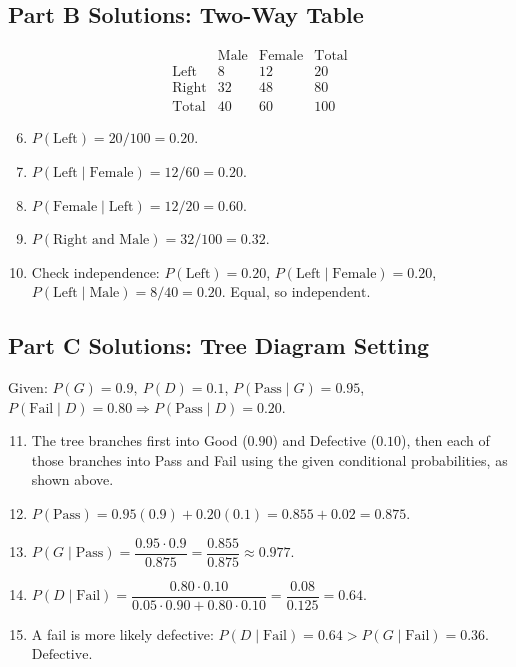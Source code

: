 \documentclass[14pt]{extarticle}
\begin{document}
\subsection*{Part B Solutions: Two-Way Table}
\[
\begin{array}{c|ccc}
 & \text{Male} & \text{Female} & \text{Total} \\ \hline
\text{Left} & 8 & 12 & 20\\
\text{Right} & 32 & 48 & 80\\ \hline
\text{Total} & 40 & 60 & 100
\end{array}
\]
\begin{enumerate}
  \setcounter{enumi}{5}
  \item \(P(\text{Left})=20/100=\boxed{0.20}\).
  \item \(P(\text{Left}\mid \text{Female})=12/60=\boxed{0.20}\).
  \item \(P(\text{Female}\mid \text{Left})=12/20=\boxed{0.60}\).
  \item \(P(\text{Right and Male})=32/100=\boxed{0.32}\).
  \item Check independence: \(P(\text{Left})=0.20\), \(P(\text{Left}\mid \text{Female})=0.20\), \(P(\text{Left}\mid \text{Male})=8/40=0.20\). Equal, so \(\boxed{\text{independent}}\).
\end{enumerate}

\subsection*{Part C Solutions: Tree Diagram Setting}
Given: \(P(G)=0.9,\ P(D)=0.1\), \(P(\text{Pass}\mid G)=0.95\), \(P(\text{Fail}\mid D)=0.80\Rightarrow P(\text{Pass}\mid D)=0.20\).
\begin{enumerate}
  \setcounter{enumi}{10}
  \item The tree branches first into Good (\(0.90\)) and Defective (\(0.10\)), then each of those branches into Pass and Fail using the given conditional probabilities, as shown above.
  \item \(P(\text{Pass})=0.95(0.9)+0.20(0.1)=0.855+0.02=\boxed{0.875}\).
  \item \(P(G\mid \text{Pass})=\dfrac{0.95\cdot0.9}{0.875}=\dfrac{0.855}{0.875}\approx\boxed{0.977}\).
  \item \(P(D\mid \text{Fail})=\dfrac{0.80\cdot0.10}{0.05\cdot0.90+0.80\cdot0.10}=\dfrac{0.08}{0.125}=\boxed{0.64}\).
  \item A fail is more likely defective: \(P(D\mid \text{Fail})=0.64 > P(G\mid \text{Fail})=0.36\). \(\boxed{\text{Defective}}\).
\end{enumerate}
\end{document}
